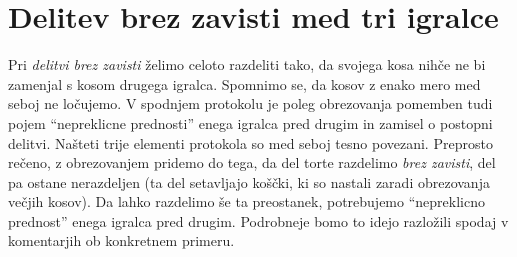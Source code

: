 \documentclass[a4paper,12pt]{article}
\begin{document}
\section{Delitev brez zavisti med tri igralce}

Pri {\em delitvi brez zavisti} želimo celoto razdeliti tako, da svojega kosa nihče ne bi zamenjal s kosom drugega igralca. Spomnimo se, da kosov z enako mero med seboj ne ločujemo. V spodnjem protokolu je poleg obrezovanja pomemben tudi pojem ``nepreklicne prednosti'' enega igralca pred drugim in zamisel o postopni delitvi. Našteti trije elementi protokola so med seboj tesno povezani. Preprosto rečeno, z obrezovanjem pridemo do tega, da del torte razdelimo {\em brez zavisti}, del pa ostane nerazdeljen (ta del setavljajo koščki, ki so nastali zaradi obrezovanja večjih kosov). Da lahko razdelimo še ta preostanek, potrebujemo ``nepreklicno prednost'' enega igralca pred drugim. Podrobneje bomo to idejo razložili spodaj v komentarjih ob konkretnem primeru.
\end{document}
